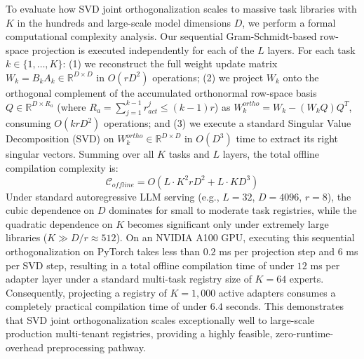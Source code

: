 \documentclass{article}
\theoremstyle{plain}
\theoremstyle{definition}
\theoremstyle{remark}
\begin{document}
To evaluate how SVD joint orthogonalization scales to massive task libraries with $K$ in the hundreds and large-scale model dimensions $D$, we perform a formal computational complexity analysis. Our sequential Gram-Schmidt-based row-space projection is executed independently for each of the $L$ layers. For each task $k \in \{1, \dots, K\}$: (1) we reconstruct the full weight update matrix $W_k = B_k A_k \in \mathbb{R}^{D \times D}$ in $O(r D^2)$ operations; (2) we project $W_k$ onto the orthogonal complement of the accumulated orthonormal row-space basis $Q \in \mathbb{R}^{D \times R_a}$ (where $R_a = \sum_{j=1}^{k-1} r_{act}^j \le (k-1)r$) as $W_k^{ortho} = W_k - (W_k Q) Q^T$, consuming $O(k r D^2)$ operations; and (3) we execute a standard Singular Value Decomposition (SVD) on $W_k^{ortho} \in \mathbb{R}^{D \times D}$ in $O(D^3)$ time to extract its right singular vectors. Summing over all $K$ tasks and $L$ layers, the total offline compilation complexity is:
\begin{equation}
  \mathcal{C}_{offline} = O\left( L \cdot K^2 r D^2 + L \cdot K D^3 \right)
\end{equation}
Under standard autoregressive LLM serving (e.g., $L=32$, $D=4096$, $r=8$), the cubic dependence on $D$ dominates for small to moderate task registries, while the quadratic dependence on $K$ becomes significant only under extremely large libraries ($K \gg D/r \approx 512$). On an NVIDIA A100 GPU, executing this sequential orthogonalization on PyTorch takes less than $0.2$ ms per projection step and $6$ ms per SVD step, resulting in a total offline compilation time of under $12$ ms per adapter layer under a standard multi-task registry size of $K=64$ experts. Consequently, projecting a registry of $K=1,000$ active adapters consumes a completely practical compilation time of under $6.4$ seconds. This demonstrates that SVD joint orthogonalization scales exceptionally well to large-scale production multi-tenant registries, providing a highly feasible, zero-runtime-overhead preprocessing pathway.
\end{document}
